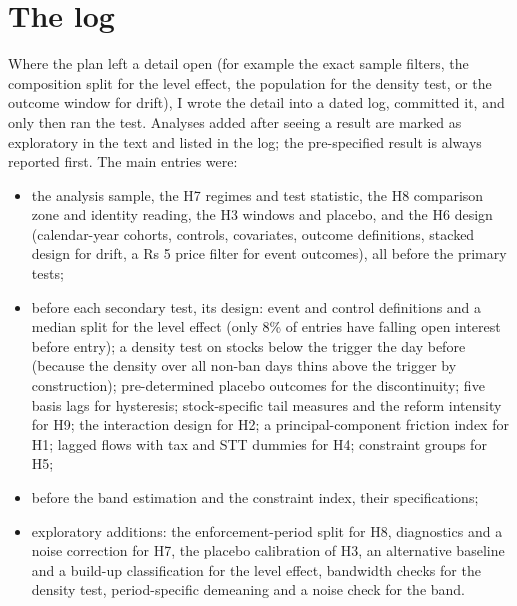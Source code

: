 \section{The log}
Where the plan left a detail open (for example the exact sample filters, the composition split for the level effect, the
population for the density test, or the outcome window for drift), I wrote the detail into a dated log, committed it,
and only then ran the test. Analyses added after seeing a result are marked as exploratory in the text and listed in the
log; the pre-specified result is always reported first. The main entries were:
\begin{itemize}
\item the analysis sample, the H7 regimes and test statistic, the H8 comparison zone and identity reading, the H3 windows
and placebo, and the H6 design (calendar-year cohorts, controls, covariates, outcome definitions, stacked design for drift,
a Rs 5 price filter for event outcomes), all before the primary tests;
\item before each secondary test, its design: event and control definitions and a median split for the level effect (only
8\% of entries have falling open interest before entry); a density test on stocks below the trigger the day before
(because the density over all non-ban days thins above the trigger by construction); pre-determined placebo outcomes for
the discontinuity; five basis lags for hysteresis; stock-specific tail measures and the reform intensity for H9; the
interaction design for H2; a principal-component friction index for H1; lagged flows with tax and STT dummies for H4;
constraint groups for H5;
\item before the band estimation and the constraint index, their specifications;
\item exploratory additions: the enforcement-period split for H8, diagnostics and a noise correction for H7, the placebo
calibration of H3, an alternative baseline and a build-up classification for the level effect, bandwidth checks for the
density test, period-specific demeaning and a noise check for the band.
\end{itemize}
